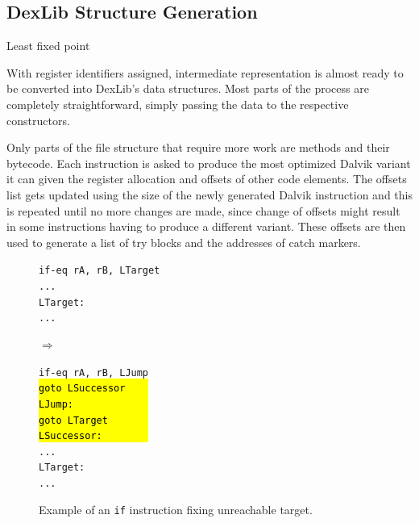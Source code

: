 \documentclass[12pt,twoside,notitlepage]{report}
\newcommand{\asm}[1] {\texttt{#1}}
\newcommand{\asmExtra}[1] {\texttt{\hl{#1}}}
\begin{document}
\subsection{DexLib Structure Generation}

Least fixed point

With register identifiers assigned, intermediate representation is almost ready to be converted into DexLib's data structures. Most parts of the process are completely straightforward, simply passing the data to the respective constructors. 

Only parts of the file structure that require more work are methods and their bytecode. Each instruction is asked to produce the most optimized Dalvik variant it can given the register allocation and offsets of other code elements. The offsets list gets updated using the size of the newly generated Dalvik instruction and this is repeated until no more changes are made,  since change of offsets might result in some instructions having to produce a different variant. These offsets are then used to generate a list of try blocks and the addresses of catch markers.

\begin{figure}
	\centering
	\begin{minipage}{0.28\textwidth}
	\begin{footnotesize}
		\asm{if-eq rA, rB, LTarget} \\
		\asm{...} \\
		\asm{LTarget:} \\
		\asm{...}
	\end{footnotesize}
	\end{minipage}
	\begin{minipage}{0.09\textwidth}
	\centering
	$\Rightarrow$
	\end{minipage}
	\begin{minipage}{0.25\textwidth}
	\begin{footnotesize}
		\asm{if-eq rA, rB, LJump} \\
		\asmExtra{goto LSuccessor~~~~} \\
		\asmExtra{LJump:~~~~~~~~~~~~~} \\
		\asmExtra{goto LTarget~~~~~~~} \\
		\asmExtra{LSuccessor:~~~~~~~~} \\
		\asm{...} \\
		\asm{LTarget:} \\
		\asm{...}
	\end{footnotesize}
	\end{minipage}
	\caption{Example of an \texttt{if} instruction fixing unreachable target.}
	\label{figure:Reassembling_FixLongJump}
\end{figure}
\end{document}
